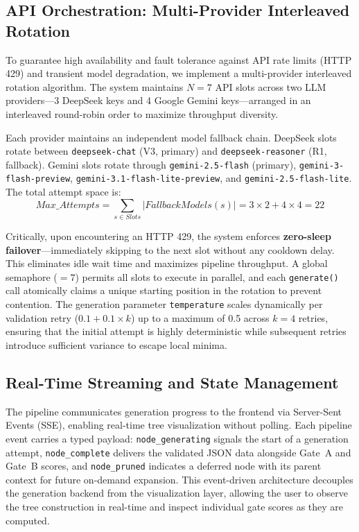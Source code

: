 \documentclass[journal]{IEEEtran}
\begin{document}
\subsection{API Orchestration: Multi-Provider Interleaved Rotation}
To guarantee high availability and fault tolerance against API rate limits (HTTP 429) and transient model degradation, we implement a multi-provider interleaved rotation algorithm. The system maintains $N=7$ API slots across two LLM providers---3 DeepSeek keys and 4 Google Gemini keys---arranged in an interleaved round-robin order to maximize throughput diversity.

Each provider maintains an independent model fallback chain. DeepSeek slots rotate between \texttt{deepseek-chat} (V3, primary) and \texttt{deepseek-reasoner} (R1, fallback). Gemini slots rotate through \texttt{gemini-2.5-flash} (primary), \texttt{gemini-3-flash-preview}, \texttt{gemini-3.1-flash-lite-preview}, and \texttt{gemini-2.5-flash-lite}. The total attempt space is:
\begin{equation}
Max\_Attempts = \sum_{s \in Slots} |FallbackModels(s)| = 3{\times}2 + 4{\times}4 = 22
\end{equation}

Critically, upon encountering an HTTP 429, the system enforces \textbf{zero-sleep failover}---immediately skipping to the next slot without any cooldown delay. This eliminates idle wait time and maximizes pipeline throughput. A global semaphore ($=7$) permits all slots to execute in parallel, and each \texttt{generate()} call atomically claims a unique starting position in the rotation to prevent contention. The generation parameter \texttt{temperature} scales dynamically per validation retry ($0.1 + 0.1 \times k$) up to a maximum of 0.5 across $k=4$ retries, ensuring that the initial attempt is highly deterministic while subsequent retries introduce sufficient variance to escape local minima.

\subsection{Real-Time Streaming and State Management}
The pipeline communicates generation progress to the frontend via Server-Sent Events (SSE), enabling real-time tree visualization without polling. Each pipeline event carries a typed payload: \texttt{node\_generating} signals the start of a generation attempt, \texttt{node\_complete} delivers the validated JSON data alongside Gate~A and Gate~B scores, and \texttt{node\_pruned} indicates a deferred node with its parent context for future on-demand expansion. This event-driven architecture decouples the generation backend from the visualization layer, allowing the user to observe the tree construction in real-time and inspect individual gate scores as they are computed.
\end{document}

